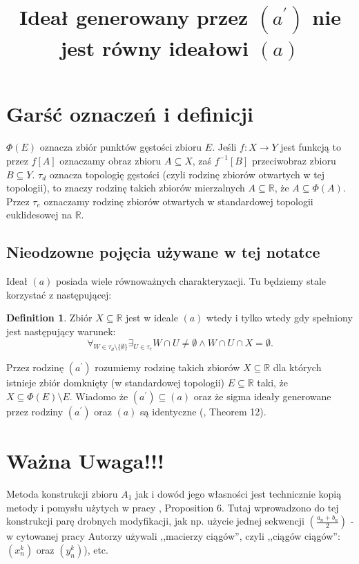 \documentclass[12pt]{amsart}
\theoremstyle{plain}
\theoremstyle{definition}
\newtheorem{definition}[theorem]{Definition}
\theoremstyle{remark}
\newcommand{\real}{\mathbb{R}}
\newcommand{\aideal}{\mathit{(a)}}
\newcommand{\aidealprime}{\mathit{(a^\prime)}}
\begin{document}
\title{Ideał generowany przez $\aidealprime$ nie jest równy ideałowi $\aideal$}


\maketitle

\section{Garść oznaczeń i definicji}
$\Phi(E)$ oznacza zbiór punktów gęstości zbioru $E$.
Jeśli $f \colon X \to Y$ jest funkcją to przez
$f[A]$ oznaczamy obraz zbioru $A\subseteq X$, 
zaś $f^{-1}[B]$ przeciwobraz zbioru $B \subseteq Y$.
$\tau_d$ oznacza topologię gęstości
(czyli rodzinę zbiorów otwartych w tej topologii),
to znaczy rodzinę takich zbiorów mierzalnych $A\subseteq\real$,
że $A \subseteq \Phi(A)$. Przez $\tau_e$ oznaczamy rodzinę
zbiorów otwartych w standardowej topologii euklidesowej na $\real$.

\subsection{Nieodzowne pojęcia używane w tej notatce}
Ideał $\aideal$ posiada wiele równoważnych charakteryzacji.
Tu będziemy stale korzystać z następującej:
\begin{definition}
  Zbiór $X \subseteq \real$ jest w ideale $\aideal$ wtedy i tylko
  wtedy gdy spełniony jest następujący warunek:
  \[
  \forall_{W \in \tau_d\setminus\lbrace\emptyset\rbrace}
    \exists_{U \in \tau_e} W \cap U \not= \emptyset \wedge
    W \cap U \cap X = \emptyset.
  \]
\end{definition}

Przez rodzinę $\aidealprime$ rozumiemy rodzinę takich zbiorów
$X\subseteq\real$ dla których istnieje zbiór
domknięty (w standardowej topologii) $E \subseteq\real$
taki, że $X \subseteq \Phi(E) \setminus E$. Wiadomo
że $\aidealprime\subseteq\aideal$ oraz że sigma ideały
generowane przez rodziny $\aidealprime$ oraz $\aideal$
są identyczne (\cite{FG}, Theorem 12).

\section{Ważna Uwaga!!!}
Metoda konstrukcji zbioru $A_1$ jak i dowód 
jego własności jest technicznie kopią metody i pomysłu
użytych w pracy \cite{FG}, Proposition 6.
Tutaj wprowadzono do tej konstrukcji parę
drobnych modyfikacji, jak np. użycie jednej
sekwencji $(\frac{a_n + b_n}{2})$ - w
cytowanej pracy Autorzy używali ,,macierzy ciągów'',
czyli ,,ciągów ciągów'': $(x_n^k)$ oraz $(y_n^k)$),
etc.
\end{document}
